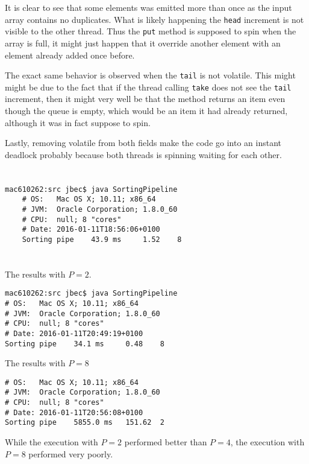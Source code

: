 \documentclass{ituhandin}
\begin{document}
It is clear to see that some elements was emitted more than once as the input array contains no duplicates. What is likely happening the  \texttt{head} increment is not visible to the other thread. Thus the \texttt{put} method is supposed to spin when the array is full, it might just happen that it override another element with an element already added once before.

The exact same behavior is observed when the \texttt{tail} is not volatile. This might might be due to the fact that if the thread calling \texttt{take} does not see the \texttt{tail} increment, then it might very well be that the method returns an item even though the queue is empty, which would be an item it had already returned, although it was in fact suppose to spin.

Lastly, removing volatile from both fields make the code go into an instant deadlock probably because both threads is spinning waiting for each other.


\section{} %
\begin{lstlisting}[language={},frame={}]
    mac610262:src jbec$ java SortingPipeline
    # OS:   Mac OS X; 10.11; x86_64
    # JVM:  Oracle Corporation; 1.8.0_60
    # CPU:  null; 8 "cores"
    # Date: 2016-01-11T18:56:06+0100
    Sorting pipe    43.9 ms     1.52    8
\end{lstlisting}
\section{} %


The results with $P = 2$.
\begin{lstlisting}[language={},frame={}, gobble=2]
mac610262:src jbec$ java SortingPipeline
# OS:   Mac OS X; 10.11; x86_64
# JVM:  Oracle Corporation; 1.8.0_60
# CPU:  null; 8 "cores"
# Date: 2016-01-11T20:49:19+0100
Sorting pipe    34.1 ms     0.48    8
\end{lstlisting}


The results with $P = 8$
\begin{lstlisting}[language={},frame={}]
# OS:   Mac OS X; 10.11; x86_64
# JVM:  Oracle Corporation; 1.8.0_60
# CPU:  null; 8 "cores"
# Date: 2016-01-11T20:56:08+0100
Sorting pipe    5855.0 ms   151.62  2
\end{lstlisting}

While the execution with $P = 2$ performed better than $P = 4$, the execution with $P = 8$ performed very poorly.
\end{document}
